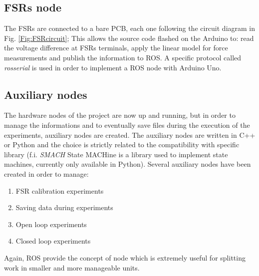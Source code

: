 \subsection{FSRs node}
The FSRs are connected to a bare PCB, each one following the circuit diagram in Fig. \ref{Fig:FSRcircuit}; This allows the source code flashed on the Arduino to: read the voltage difference at FSRs terminals, apply the linear model for force measurements and publish the information to ROS. A specific protocol called \textit{rosserial} is used in order to implement a ROS node with Arduino Uno.\\

\subsection{Auxiliary nodes}
The hardware nodes of the project are now up and running, but in order to manage the informations and to eventually save files during the execution of the experiments, auxiliary nodes are created.
The auxiliary nodes are written in C++ or Python and the choice is strictly related to the compatibility with specific library (f.i. \textit{SMACH} State MACHine is a library used to implement state machines, currently only available in Python).
Several auxiliary nodes have been created in order to manage:
\begin{enumerate}
\item FSR calibration experiments
\item Saving data during experiments
\item Open loop experiments
\item Closed loop experiments
\end{enumerate}
Again, ROS provide the concept of node which is extremely useful for splitting work in smaller and more manageable units.\\

